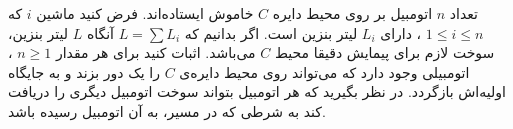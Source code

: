 \EXERCISE
 تعداد $n$ اتومبیل  بر روی محیط دایره $C$ خاموش ایستاده‌اند. فرض کنید ماشین $i$ که $1 \leq i \leq n$
    ، دارای 
    $L_{i}$
     لیتر بنزین است. اگر بدانیم که 
    $L = \sum L_{i}$
    آنگاه $L$ لیتر بنزین، سوخت لازم برای پیمایش دقیقا محیط $C$ می‌باشد. اثبات کنید برای هر مقدار 
$n \geq 1$
    ، اتومبیلی  وجود دارد که می‌تواند روی محیط دایره‌ی $C$ را یک دور بزند و به جایگاه اولیه‌اش بازگردد. در نظر بگیرید که هر اتومبیل  بتواند سوخت اتومبیل  دیگری
    را دریافت کند به شرطی که در مسیر، به آن اتومبیل  رسیده باشد.